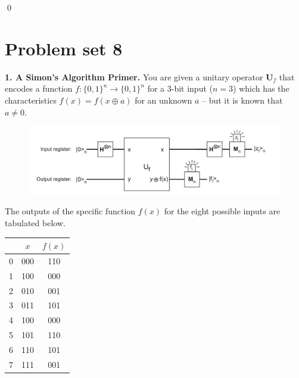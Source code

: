 \documentclass{book}
\theoremstyle{definition}
\newcommand{\U}{\mathbf{U}}
\begin{document}
\qed


\newpage















\section{Problem set 8}


\noindent \textbf{1. A Simon's Algorithm Primer.} You are given a unitary operator $\U_f$ that encodes a function $f: \{0,1\}^n \to \{0,1\}^n$ for a 3-bit input ($n = 3$) which has the characteristics $f(x) = f(x\oplus a)$ for an unknown $a$ -- but it is known that $a\neq 0$. \\

\begin{figure}[!htb]
	\centering
	\includegraphics[scale=0.5]{simon1}
\end{figure} 

The outputs of the specific function $f(x)$ for the eight possible inputs are tabulated below.


\begin{center}
	\begin{tabular}{|c|c|c|}
		\hline
		\multicolumn{1}{c}{} & \multicolumn{1}{c}{$x$} & \multicolumn{1}{c}{$f(x)$}\\
		 \hline
		0 & 000 & 110\\
		\hline
		1 & 100 & 000\\
		\hline
		2 & 010 & 001\\
		\hline
		3 & 011 & 101\\
		\hline
		4 & 100 & 000\\
		\hline
		5 & 101 & 110\\
		\hline
		6 & 110 & 101\\
		\hline
		7 & 111 & 001\\
		\hline
	\end{tabular}
\end{center}
\end{document}
